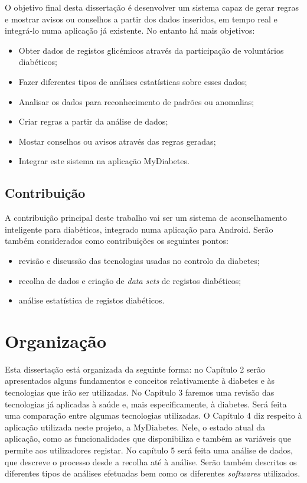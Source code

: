 O objetivo final desta dissertação é desenvolver um sistema capaz de gerar regras e mostrar avisos ou conselhos a partir dos dados inseridos, em tempo real e integrá-lo numa aplicação já existente. No entanto há mais objetivos:

\begin{itemize}
	\item Obter dados de registos glicémicos através da participação de voluntários diabéticos;
	\item Fazer diferentes tipos de análises estatísticas sobre esses dados;
	\item Analisar os dados para reconhecimento de padrões ou anomalias;
	\item Criar regras a partir da análise de dados;
	\item Mostar conselhos ou avisos através das regras geradas;
	\item Integrar este sistema na aplicação MyDiabetes.
\end{itemize}

\subsection{Contribuição}


A contribuição principal deste trabalho vai ser um sistema de aconselhamento inteligente para diabéticos, integrado numa aplicação para Android. Serão também considerados como contribuições os seguintes pontos:

\begin{itemize}
	\item revisão e discussão das tecnologias usadas no controlo da diabetes;
	\item recolha de dados e criação de \textit{data sets} de registos diabéticos;
	\item análise estatística de registos diabéticos.
\end{itemize}


\section{Organização}

Esta dissertação está organizada da seguinte forma: no Capítulo 2 serão apresentados alguns fundamentos e conceitos relativamente à diabetes e às tecnologias que irão ser utilizadas.
No Capítulo 3 faremos uma revisão das tecnologias já aplicadas à saúde e, mais especificamente, à diabetes. Será feita uma comparação entre algumas tecnologias utilizadas.
O Capítulo 4 diz respeito à aplicação utilizada neste projeto, a MyDiabetes. Nele, o estado atual da aplicação, como as funcionalidades que disponibiliza e também as variáveis que permite aos utilizadores registar.
No capítulo 5 será feita uma análise de dados, que descreve o processo desde a recolha até à análise. Serão também descritos os diferentes tipos de análises efetuadas bem como os diferentes \textit{softwares} utilizados. 






